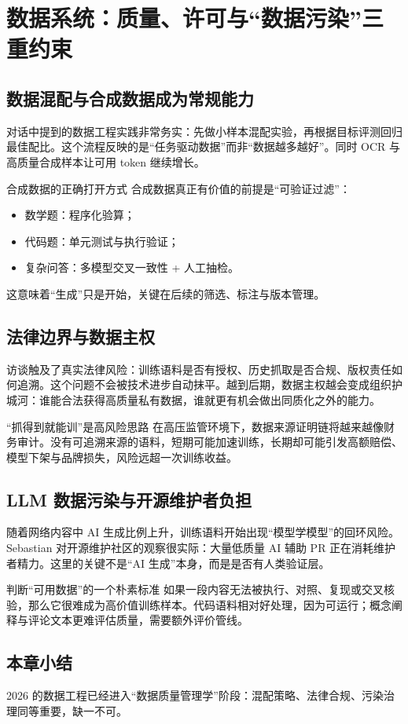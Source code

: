 \section{数据系统：质量、许可与“数据污染”三重约束}

\subsection{数据混配与合成数据成为常规能力}

对话中提到的数据工程实践非常务实：先做小样本混配实验，再根据目标评测回归最佳配比。这个流程反映的是“任务驱动数据”而非“数据越多越好”。同时 OCR 与高质量合成样本让可用 token 继续增长。

\begin{importantbox}{合成数据的正确打开方式}
合成数据真正有价值的前提是“可验证过滤”：
\begin{itemize}[leftmargin=1.5em]
    \item 数学题：程序化验算；
    \item 代码题：单元测试与执行验证；
    \item 复杂问答：多模型交叉一致性 + 人工抽检。
\end{itemize}
这意味着“生成”只是开始，关键在后续的筛选、标注与版本管理。
\end{importantbox}

\subsection{法律边界与数据主权}

访谈触及了真实法律风险：训练语料是否有授权、历史抓取是否合规、版权责任如何追溯。这个问题不会被技术进步自动抹平。越到后期，数据主权越会变成组织护城河：谁能合法获得高质量私有数据，谁就更有机会做出同质化之外的能力。

\begin{warningbox}{“抓得到就能训”是高风险思路}
在高压监管环境下，数据来源证明链将越来越像财务审计。没有可追溯来源的语料，短期可能加速训练，长期却可能引发高额赔偿、模型下架与品牌损失，风险远超一次训练收益。
\end{warningbox}

\subsection{LLM 数据污染与开源维护者负担}

随着网络内容中 AI 生成比例上升，训练语料开始出现“模型学模型”的回环风险。Sebastian 对开源维护社区的观察很实际：大量低质量 AI 辅助 PR 正在消耗维护者精力。这里的关键不是“AI 生成”本身，而是是否有人类验证层。

\begin{knowledgebox}{判断“可用数据”的一个朴素标准}
如果一段内容无法被执行、对照、复现或交叉核验，那么它很难成为高价值训练样本。代码语料相对好处理，因为可运行；概念阐释与评论文本更难评估质量，需要额外评价管线。
\end{knowledgebox}

\subsection{本章小结}

2026 的数据工程已经进入“数据质量管理学”阶段：混配策略、法律合规、污染治理同等重要，缺一不可。

